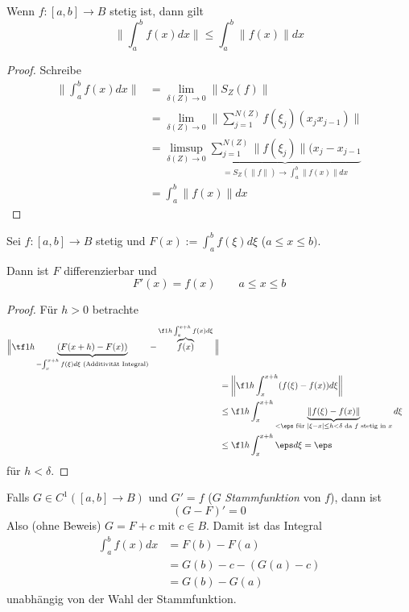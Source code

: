 \begin{st} \label{3.4}
	Wenn $f:[a,b] \to B$ stetig ist, dann gilt
	\[
		\bigg\| \int_a^b f(x) dx \bigg\| \le \int_a^b \|f(x)\| dx
	\]
	\begin{proof}
		Schreibe
		\begin{align*}
			\bigg\|\int_a^b f(x) dx \bigg\| 
			&= \lim_{\delta(Z)\to 0} \|S_Z(f)\| \\
			&= \lim_{\delta(Z)\to 0} \bigg\| \sum_{j=1}^{N(Z)} f(\xi_j) (x_{j} x_{j-1}) \bigg\| \\
			&= \limsup_{\delta(Z) \to 0} \underbrace{\sum_{j=1}^{N(Z)} \| f(\xi_j) \| (x_j - x_{j-1}}_{= S_Z(\|f\|) \to \int_a^b \|f(x)\| dx} \\
			&= \int_a^b \|f(x)\| dx
		\end{align*}
	\end{proof}
\end{st}

\begin{st}[Hauptsatz] \label{3.5}
	Sei $f: [a,b] \to B$ stetig und $F(x) := \int_a^b f(\xi) d\xi$ ($a \le x \le b)$.

	Dann ist $F$ differenzierbar und 
	\[
		F'(x) = f(x) 
		\qquad a \le x \le b
	\]
	\begin{proof}
		Für $h > 0$ betrachte
		\begin{align*}
			\Big\| \tf 1h \underbrace{(F(x+h) - F(x))}_{= \int_x^{x+h}f(\xi) d\xi \text{ (Additivität Integral)}} - \overbrace{f(x)}^{\f 1h \int_{x}^{x+h}f(x) d\xi} \Big\| \\
			&= \bigg\| \f 1h \int_x^{x+h} (f(\xi) - f(x)) d\xi \bigg\|  \\
			&\le \f 1h \int_x^{x+h} \underbrace{\|f(\xi) - f(x)\|}_{< \eps \text{ für } |\xi - x| \le h < \delta \text{ da $f$ stetig in $x$}} d\xi \\
			&\le \f 1h \int_x^{x+h} \eps d\xi = \eps
		\end{align*}
		für $h < \delta$.
	\end{proof}
\end{st}

\begin{kor}[Folgerung] \label{3.6}
	Falls $G \in C^1([a,b] \to B)$ und $G' = f$ ($G$ \emph{Stammfunktion} von $f$), dann ist
	\[
		(G - F)' = 0
	\]
	Also (ohne Beweis) $G = F + c$ mit $c \in B$.
	Damit ist das Integral
	\begin{align*}
		\int_a^b f(x) dx 
		&= F(b) - F(a) \\
		&= G(b) - c - (G(a) - c) \\
		&= G(b) - G(a)
	\end{align*}
	unabhängig von der Wahl der Stammfunktion.
\end{kor}

